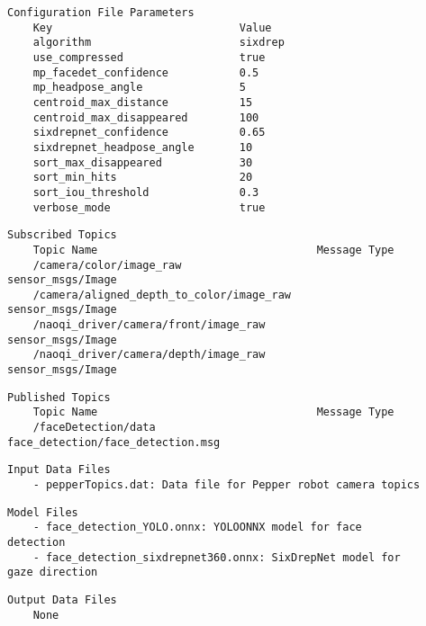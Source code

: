 \documentclass{CSSRforAfrica}
\newcommand{\checkboxChecked}{\fbox{\ding{51}}} %
\begin{document}
\begin{description}
\item[\checkboxChecked] 
 {\small 
\begin{verbatim}
Configuration File Parameters
    Key                             Value
    algorithm                       sixdrep
    use_compressed                  true
    mp_facedet_confidence           0.5
    mp_headpose_angle               5
    centroid_max_distance           15
    centroid_max_disappeared        100
    sixdrepnet_confidence           0.65
    sixdrepnet_headpose_angle       10
    sort_max_disappeared            30
    sort_min_hits                   20
    sort_iou_threshold              0.3
    verbose_mode                    true
\end{verbatim}}

\item[\checkboxChecked] 
 {\small 
\begin{verbatim}
Subscribed Topics
    Topic Name                                  Message Type
    /camera/color/image_raw                     sensor_msgs/Image              
    /camera/aligned_depth_to_color/image_raw    sensor_msgs/Image
    /naoqi_driver/camera/front/image_raw        sensor_msgs/Image
    /naoqi_driver/camera/depth/image_raw        sensor_msgs/Image
\end{verbatim}}

\item[\checkboxChecked] 
 {\small 
\begin{verbatim}
Published Topics
    Topic Name                                  Message Type
    /faceDetection/data                         face_detection/face_detection.msg
\end{verbatim}}

\item[\checkboxChecked] 
 {\small 
\begin{verbatim}
Input Data Files
    - pepperTopics.dat: Data file for Pepper robot camera topics
\end{verbatim}}

\item[\checkboxChecked] 
 {\small 
\begin{verbatim}
Model Files
    - face_detection_YOLO.onnx: YOLOONNX model for face detection
    - face_detection_sixdrepnet360.onnx: SixDrepNet model for gaze direction
\end{verbatim}}

\item[\checkboxChecked] 
 {\small 
\begin{verbatim}
Output Data Files
    None
\end{verbatim}}


\end{description}
\end{document}
